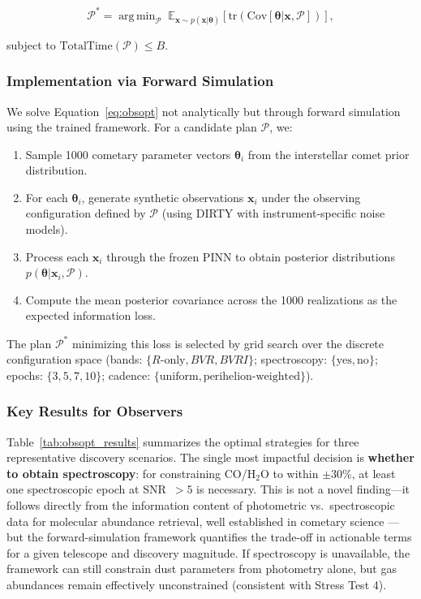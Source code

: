 \documentclass[usenatbib]{mnras}
\DeclareMathOperator*{\argmin}{arg\,min}
\begin{document}
\begin{equation}\label{eq:obsopt}
\mathcal{P}^* = \argmin_{\mathcal{P}} \; \mathbb{E}_{\mathbf{x} \sim p(\mathbf{x}|\boldsymbol{\theta})}\left[\text{tr}\left(\text{Cov}[\boldsymbol{\theta} | \mathbf{x}, \mathcal{P}]\right)\right],
\end{equation}

subject to $\text{TotalTime}(\mathcal{P}) \leq B$.

\subsubsection{Implementation via Forward Simulation}

We solve Equation~\ref{eq:obsopt} not analytically but through forward simulation using the trained framework. For a candidate plan $\mathcal{P}$, we:

\begin{enumerate}
    \item Sample 1000 cometary parameter vectors $\boldsymbol{\theta}_i$ from the interstellar comet prior distribution.
    \item For each $\boldsymbol{\theta}_i$, generate synthetic observations $\mathbf{x}_i$ under the observing configuration defined by $\mathcal{P}$ (using DIRTY with instrument-specific noise models).
    \item Process each $\mathbf{x}_i$ through the frozen PINN to obtain posterior distributions $p(\boldsymbol{\theta} | \mathbf{x}_i, \mathcal{P})$.
    \item Compute the mean posterior covariance across the 1000 realizations as the expected information loss.
\end{enumerate}

The plan $\mathcal{P}^*$ minimizing this loss is selected by grid search over the discrete configuration space (bands: $\{R\text{-only}, BVR, BVRI\}$; spectroscopy: $\{\text{yes}, \text{no}\}$; epochs: $\{3, 5, 7, 10\}$; cadence: $\{\text{uniform}, \text{perihelion-weighted}\}$).

\subsubsection{Key Results for Observers}

Table~\ref{tab:obsopt_results} summarizes the optimal strategies for three representative discovery scenarios. The single most impactful decision is \textbf{whether to obtain spectroscopy}: for constraining CO/H$_2$O to within $\pm 30\%$, at least one spectroscopic epoch at SNR~$>5$ is necessary. This is not a novel finding---it follows directly from the information content of photometric vs.\ spectroscopic data for molecular abundance retrieval, well established in cometary science \citep{bockelee04}---but the forward-simulation framework quantifies the trade-off in actionable terms for a given telescope and discovery magnitude. If spectroscopy is unavailable, the framework can still constrain dust parameters from photometry alone, but gas abundances remain effectively unconstrained (consistent with Stress Test 4).
\end{document}
